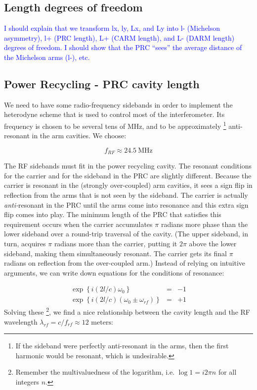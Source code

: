 \subsection*{Length degrees of freedom}

\textcolor{blue}{I should explain that we transform lx, ly, Lx, and
Ly into l- (Michelson asymmetry), l+ (PRC length), L+ (CARM length),
and L- (DARM length) degrees of freedom. I should show that the PRC
{}``sees'' the average distance of the Michelson arms (l-), etc.}


\subsection*{Power Recycling - PRC cavity length}

We need to have some radio-frequency sidebands in order to implement
the heterodyne scheme that is used to control most of the interferometer.
Its frequency is chosen to be several tens of MHz, and to be approximately%
\footnote{If the sideband were perfectly anti-resonant in the arms, then the
first harmonic would be resonant, which is undesirable.%
} anti-resonant in the arm cavities. We choose:

\[
f_{RF}\approx24.5\mathrm{{\ MHz}}
\]


The RF sidebands must fit in the power recycling cavity. The resonant
conditions for the carrier and for the sideband in the PRC are slightly
different. Because the carrier is resonant in the (strongly over-coupled)
arm cavities, it sees a sign flip in reflection from the arms that
is not seen by the sideband. The carrier is actually \emph{anti-}resonant
in the PRC until the arms come into resonance and this extra sign
flip comes into play. The minimum length of the PRC that satisfies
this requirement occurs when the carrier accumulates $\pi$ radians
more phase than the lower sideband over a round-trip traversal of
the cavity. (The upper sideband, in turn, acquires $\pi$ radians
more than the carrier, putting it $2\pi$ above the lower sideband,
making them simultaneously resonant. The carrier gets its final $\pi$
radians on reflection from the over-coupled arm.) Instead of relying
on intuitive arguments, we can write down equations for the conditions
of resonance:

\begin{eqnarray}
\exp \left\{i (2l/c)\omega_{0}  \right\} &=& -1 \\
\exp \left\{i (2l/c)(\omega_{0} \pm \omega_{rf}) \right\} &=& +1
\end{eqnarray}Solving these%
\footnote{Remember the multivaluedness of the logarithm, i.e. $\log1=i2\pi n$
for all integers $n$.%
}, we find a nice relationship between the cavity length and the RF
wavelength $\lambda_{rf}=c/f_{rf}\approx12\text{ meters}$:

